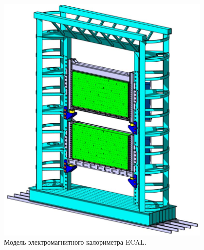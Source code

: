 \begin{minipage}[t]{0.495\textwidth}
\begin{figure}[H]
\includegraphics[width=0.95\textwidth]{pictures/CBM_ECAL_new.png}
\caption{Модель электромагнитного калориметра ECAL.}
\label{fig:ECAL}
\end{figure}
\end{minipage}
